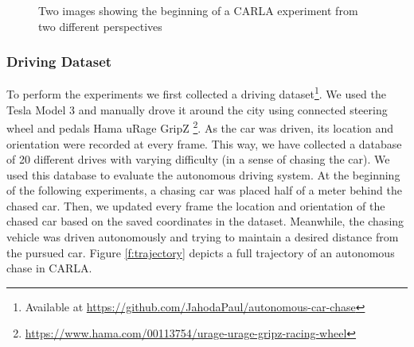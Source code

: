 \documentclass{ctuthesis/ctuthesis}
\begin{document}
\begin{figure}[]
    \centering
    \qquad
    \caption{Two images showing the beginning of a CARLA experiment from two different perspectives}%
    \label{fig:CARLA}%
\end{figure}



\subsubsection{Driving Dataset} \label{s:drivingDataset}
To perform the experiments we first collected a driving dataset\footnote{Available at \href{https://github.com/JahodaPaul/autonomous-car-chase}{https://github.com/JahodaPaul/autonomous-car-chase}}. We used the Tesla Model 3 and manually drove it around the city using connected steering wheel and pedals Hama uRage GripZ \footnote{\href{https://www.hama.com/00113754/urage-urage-gripz-racing-wheel}{https://www.hama.com/00113754/urage-urage-gripz-racing-wheel}}. As the car was driven, its location and orientation were recorded at every frame. This way, we have collected a database of 20 different drives with varying difficulty (in a sense of chasing the car). We used this database to evaluate the autonomous driving system. At the beginning of the following experiments, a chasing car was placed half of a meter behind the chased car. Then, we updated every frame the location and orientation of the chased car based on the saved coordinates in the dataset. Meanwhile, the chasing vehicle was driven autonomously and trying to maintain a desired distance from the pursued car. Figure \ref{f:trajectory} depicts a full trajectory of an autonomous chase in CARLA.\par
\end{document}
